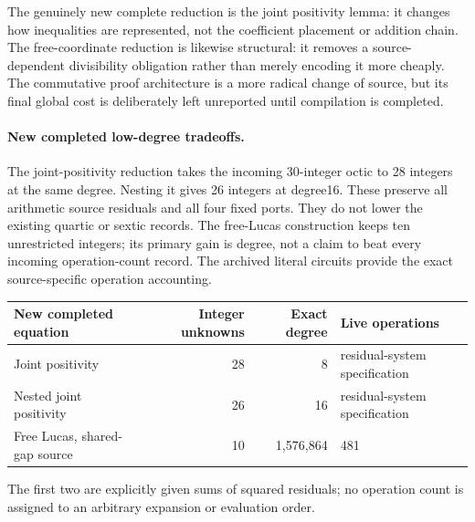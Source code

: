 The genuinely new complete reduction is the joint positivity lemma:
it changes how inequalities are represented, not the coefficient placement
or addition chain. The free-coordinate reduction is likewise structural:
it removes a source-dependent divisibility obligation rather than merely
encoding it more cheaply. The commutative proof architecture is a more
radical change of source, but its final global cost is deliberately left
unreported until compilation is completed.

\paragraph{New completed low-degree tradeoffs.}
The joint-positivity reduction takes the incoming 30-integer octic to
28 integers at the same degree. Nesting it gives 26 integers at degree16.
These preserve all arithmetic source residuals and all four fixed ports.
They do not lower the existing quartic or sextic records. The free-Lucas
construction keeps ten unrestricted integers; its primary gain is degree,
not a claim to beat every incoming operation-count record. The archived
literal circuits provide the exact source-specific operation accounting.

\begin{center}
\begin{tabular}{@{}lrrp{43mm}@{}}\toprule
New completed equation & Integer unknowns & Exact degree & Live operations\\\midrule
Joint positivity & 28 & 8 & residual-system specification\\
Nested joint positivity & 26 & 16 & residual-system specification\\
Free Lucas, shared-gap source & 10 & 1,576,864 & 481\\\bottomrule
\end{tabular}
\end{center}
The first two are explicitly given sums of squared residuals; no operation
count is assigned to an arbitrary expansion or evaluation order.
